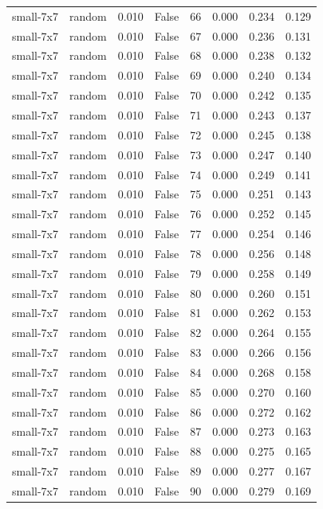 \begin{tabular}{llrrrrrr}
small-7x7 & random & 0.010 & False & 66 & 0.000 & 0.234 & 0.129 \\
small-7x7 & random & 0.010 & False & 67 & 0.000 & 0.236 & 0.131 \\
small-7x7 & random & 0.010 & False & 68 & 0.000 & 0.238 & 0.132 \\
small-7x7 & random & 0.010 & False & 69 & 0.000 & 0.240 & 0.134 \\
small-7x7 & random & 0.010 & False & 70 & 0.000 & 0.242 & 0.135 \\
small-7x7 & random & 0.010 & False & 71 & 0.000 & 0.243 & 0.137 \\
small-7x7 & random & 0.010 & False & 72 & 0.000 & 0.245 & 0.138 \\
small-7x7 & random & 0.010 & False & 73 & 0.000 & 0.247 & 0.140 \\
small-7x7 & random & 0.010 & False & 74 & 0.000 & 0.249 & 0.141 \\
small-7x7 & random & 0.010 & False & 75 & 0.000 & 0.251 & 0.143 \\
small-7x7 & random & 0.010 & False & 76 & 0.000 & 0.252 & 0.145 \\
small-7x7 & random & 0.010 & False & 77 & 0.000 & 0.254 & 0.146 \\
small-7x7 & random & 0.010 & False & 78 & 0.000 & 0.256 & 0.148 \\
small-7x7 & random & 0.010 & False & 79 & 0.000 & 0.258 & 0.149 \\
small-7x7 & random & 0.010 & False & 80 & 0.000 & 0.260 & 0.151 \\
small-7x7 & random & 0.010 & False & 81 & 0.000 & 0.262 & 0.153 \\
small-7x7 & random & 0.010 & False & 82 & 0.000 & 0.264 & 0.155 \\
small-7x7 & random & 0.010 & False & 83 & 0.000 & 0.266 & 0.156 \\
small-7x7 & random & 0.010 & False & 84 & 0.000 & 0.268 & 0.158 \\
small-7x7 & random & 0.010 & False & 85 & 0.000 & 0.270 & 0.160 \\
small-7x7 & random & 0.010 & False & 86 & 0.000 & 0.272 & 0.162 \\
small-7x7 & random & 0.010 & False & 87 & 0.000 & 0.273 & 0.163 \\
small-7x7 & random & 0.010 & False & 88 & 0.000 & 0.275 & 0.165 \\
small-7x7 & random & 0.010 & False & 89 & 0.000 & 0.277 & 0.167 \\
small-7x7 & random & 0.010 & False & 90 & 0.000 & 0.279 & 0.169 \\

\end{tabular}
